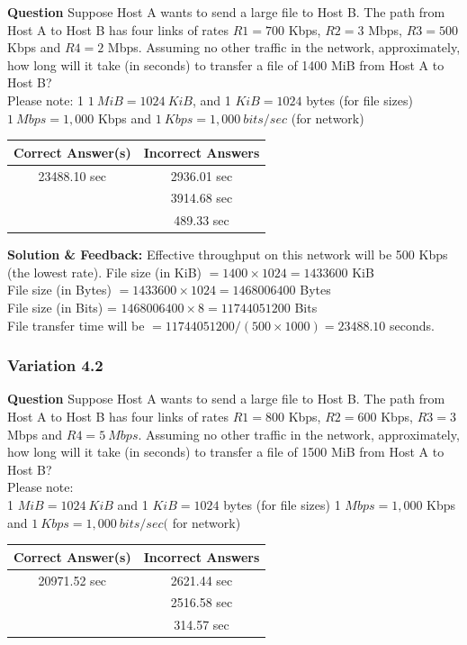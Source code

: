 \textbf{Question} Suppose Host A wants to send a large file to Host B. The path from Host A to Host B has four links of rates \(R1=700\) Kbps, \(R2=3\) Mbps, \(R3=500\) Kbps and \(R4=2\) Mbps. Assuming no other traffic in the network, approximately, how long will it take (in seconds) to transfer a file of 1400 MiB from Host A to Host B? \\
Please note:
1 \(1~MiB=1024~KiB\), and 1 \(KiB=1024\) bytes (for file sizes)
\(1~Mbps=1,000\) Kbps and \(1~Kbps=1,000~bits/sec\) (for network) \\
\begin{tabular}{|c|c|}
    \hline
    \textbf{Correct Answer(s)} & \textbf{Incorrect Answers} \\
    \hline
    23488.10 sec & 2936.01 sec \\
        & 3914.68 sec \\
        & 489.33 sec \\
    \hline
\end{tabular}
\textbf{Solution \& Feedback:}
Effective throughput on this network will be 500 Kbps (the lowest rate).
File size (in KiB) \(=1400 \times 1024 = 1433600\) KiB \\
File size (in Bytes) \(=1433600 \times 1024 = 1468006400\) Bytes\\
File size (in Bits) = \(1468006400 \times 8 = 11744051200\) Bits\\
File transfer time will be \(=11744051200/(500 \times 1000)=23488.10\) seconds.\\

\subsubsection{Variation 4.2}

\textbf{Question} Suppose Host A wants to send a large file to Host B. The path from Host A to Host B has four links of rates \(R1=800\) Kbps, \(R2=600\) Kbps, \(R3=3\) Mbps and \(R4=5~Mbps\). Assuming no other traffic in the network, approximately, how long will it take (in seconds) to transfer a file of 1500 MiB from Host A to Host B?\\
Please note:\\
1 \(MiB=1024~KiB\) and 1 \(KiB=1024\) bytes (for file sizes)
1 \(Mbps=1,000\) Kbps and \(1~Kbps=1,000~bits/sec(\) for network) \\
\begin{tabular}{|c|c|}
    \hline
    \textbf{Correct Answer(s)} & \textbf{Incorrect Answers} \\
    \hline
    20971.52 sec & 2621.44 sec  \\
        & 2516.58 sec  \\
        & 314.57 sec  \\
    \hline
\end{tabular}

